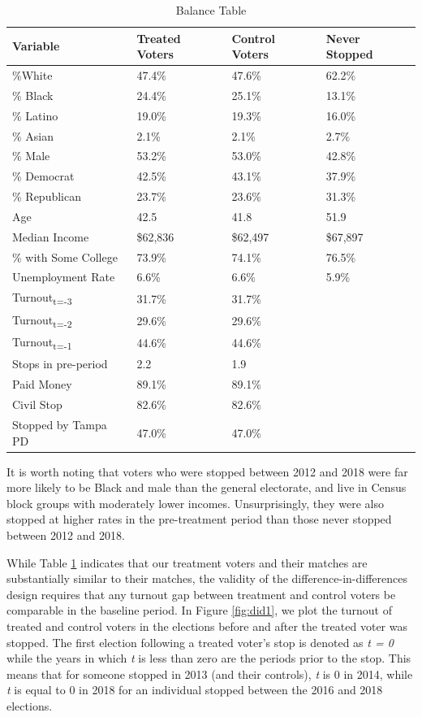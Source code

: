 \documentclass[
  12pt,
]{article}
\begin{document}
\begin{singlespace}
\begin{table}[!h]

\caption{\label{tab:baltab-chunk}\label{tab:balance} Balance Table}
\centering
\begin{tabular}[t]{llll}
\toprule
Variable & Treated Voters & Control Voters & Never Stopped\\
\midrule
\%White & 47.4\% & 47.6\% & 62.2\%\\
\% Black & 24.4\% & 25.1\% & 13.1\%\\
\% Latino & 19.0\% & 19.3\% & 16.0\%\\
\% Asian & 2.1\% & 2.1\% & 2.7\%\\
\% Male & 53.2\% & 53.0\% & 42.8\%\\
\% Democrat & 42.5\% & 43.1\% & 37.9\%\\
\% Republican & 23.7\% & 23.6\% & 31.3\%\\
Age & 42.5 & 41.8 & 51.9\\
Median Income & \$62,836 & \$62,497 & \$67,897\\
\% with Some College & 73.9\% & 74.1\% & 76.5\%\\
Unemployment Rate & 6.6\% & 6.6\% & 5.9\%\\
Turnout\textsubscript{t=-3} & 31.7\% & 31.7\% & \\
Turnout\textsubscript{t=-2} & 29.6\% & 29.6\% & \\
Turnout\textsubscript{t=-1} & 44.6\% & 44.6\% & \\
Stops in pre-period & 2.2 & 1.9 & \\
Paid Money & 89.1\% & 89.1\% & \\
Civil Stop & 82.6\% & 82.6\% & \\
Stopped by Tampa PD & 47.0\% & 47.0\% & \\
\bottomrule
\end{tabular}
\end{table}
\end{singlespace}

It is worth noting that voters who were stopped between 2012 and 2018 were far more likely to be Black and male than the general electorate, and live in Census block groups with moderately lower incomes. Unsurprisingly, they were also stopped at higher rates in the pre-treatment period than those never stopped between 2012 and 2018.

While Table \ref{tab:balance} indicates that our treatment voters and their matches are substantially similar to their matches, the validity of the difference-in-differences design requires that any turnout gap between treatment and control voters be comparable in the baseline period. In Figure \ref{fig:did1}, we plot the turnout of treated and control voters in the elections before and after the treated voter was stopped. The first election following a treated voter's stop is denoted as \emph{t = 0} while the years in which \emph{t} is less than zero are the periods prior to the stop. This means that for someone stopped in 2013 (and their controls), \emph{t} is 0 in 2014, while \emph{t} is equal to 0 in 2018 for an individual stopped between the 2016 and 2018 elections.
\end{document}
